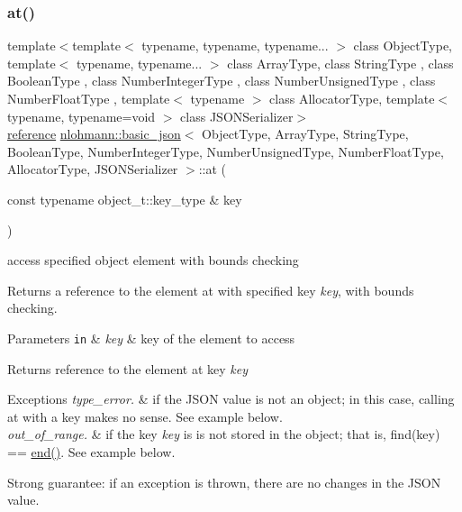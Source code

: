 \subsubsection{\texorpdfstring{at()}{at()}\hspace{0.1cm}{\footnotesize\ttfamily [3/6]}}
{\footnotesize\ttfamily template$<$template$<$ typename, typename, typename... $>$ class Object\+Type, template$<$ typename, typename... $>$ class Array\+Type, class String\+Type , class Boolean\+Type , class Number\+Integer\+Type , class Number\+Unsigned\+Type , class Number\+Float\+Type , template$<$ typename $>$ class Allocator\+Type, template$<$ typename, typename=void $>$ class J\+S\+O\+N\+Serializer$>$ \\
\hyperlink{classnlohmann_1_1basic__json_ac6a5eddd156c776ac75ff54cfe54a5bc}{reference} \hyperlink{classnlohmann_1_1basic__json}{nlohmann\+::basic\+\_\+json}$<$ Object\+Type, Array\+Type, String\+Type, Boolean\+Type, Number\+Integer\+Type, Number\+Unsigned\+Type, Number\+Float\+Type, Allocator\+Type, J\+S\+O\+N\+Serializer $>$\+::at (\begin{DoxyParamCaption}\item[{const typename object\+\_\+t\+::key\+\_\+type \&}]{key }\end{DoxyParamCaption})\hspace{0.3cm}{\ttfamily [inline]}}



access specified object element with bounds checking 

Returns a reference to the element at with specified key {\itshape key}, with bounds checking.


\begin{DoxyParams}[1]{Parameters}
\mbox{\tt in}  & {\em key} & key of the element to access\\
\hline
\end{DoxyParams}
\begin{DoxyReturn}{Returns}
reference to the element at key {\itshape key} 
\end{DoxyReturn}

\begin{DoxyExceptions}{Exceptions}
{\em type\+\_\+error.} & if the J\+S\+ON value is not an object; in this case, calling {\ttfamily at} with a key makes no sense. See example below. \\
\hline
{\em out\+\_\+of\+\_\+range.} & if the key {\itshape key} is is not stored in the object; that is, {\ttfamily find(key) == \hyperlink{classnlohmann_1_1basic__json_a13e032a02a7fd8a93fdddc2fcbc4763c}{end()}}. See example below.\\
\hline
\end{DoxyExceptions}
Strong guarantee\+: if an exception is thrown, there are no changes in the J\+S\+ON value.

